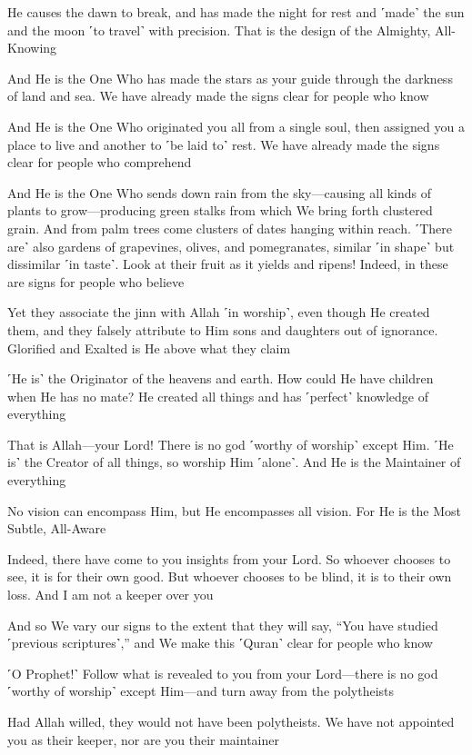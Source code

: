 He causes the dawn to break, and has made the night for rest and ˹made˺ the sun and the moon ˹to travel˺ with precision. That is the design of the Almighty, All-Knowing

And He is the One Who has made the stars as your guide through the darkness of land and sea. We have already made the signs clear for people who know

And He is the One Who originated you all from a single soul, then assigned you a place to live and another to ˹be laid to˺ rest. We have already made the signs clear for people who comprehend

And He is the One Who sends down rain from the sky—causing all kinds of plants to grow—producing green stalks from which We bring forth clustered grain. And from palm trees come clusters of dates hanging within reach. ˹There are˺ also gardens of grapevines, olives, and pomegranates, similar ˹in shape˺ but dissimilar ˹in taste˺. Look at their fruit as it yields and ripens! Indeed, in these are signs for people who believe

Yet they associate the jinn with Allah ˹in worship˺, even though He created them, and they falsely attribute to Him sons and daughters out of ignorance. Glorified and Exalted is He above what they claim

˹He is˺ the Originator of the heavens and earth. How could He have children when He has no mate? He created all things and has ˹perfect˺ knowledge of everything

That is Allah—your Lord! There is no god ˹worthy of worship˺ except Him. ˹He is˺ the Creator of all things, so worship Him ˹alone˺. And He is the Maintainer of everything

No vision can encompass Him, but He encompasses all vision. For He is the Most Subtle, All-Aware

Indeed, there have come to you insights from your Lord. So whoever chooses to see, it is for their own good. But whoever chooses to be blind, it is to their own loss. And I am not a keeper over you

And so We vary our signs to the extent that they will say, “You have studied ˹previous scriptures˺,” and We make this ˹Quran˺ clear for people who know

˹O Prophet!˺ Follow what is revealed to you from your Lord—there is no god ˹worthy of worship˺ except Him—and turn away from the polytheists

Had Allah willed, they would not have been polytheists. We have not appointed you as their keeper, nor are you their maintainer

